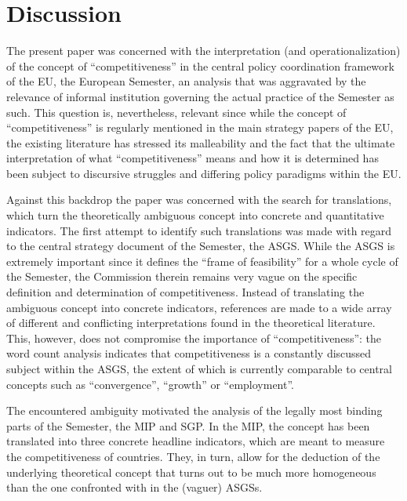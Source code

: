 \documentclass[
]{article}
\begin{document}
\FloatBarrier

\hypertarget{sec:concl}{%
\section{Discussion}\label{sec:concl}}

The present paper was concerned with the interpretation (and operationalization)
of the concept of \enquote{competitiveness} in the central policy
coordination framework of the EU, the European Semester, an analysis that
was aggravated by the relevance of informal institution governing the
actual practice of the Semester as such.
This question is, nevertheless, relevant since while the concept of
\enquote{competitiveness} is regularly mentioned in
the main strategy papers of the EU, the existing literature has stressed its
malleability and the fact
that the ultimate interpretation of what \enquote{competitiveness} means and how it
is determined has been subject to discursive struggles and differing policy
paradigms within the EU.

Against this backdrop the paper was concerned with the search for translations,
which turn the theoretically ambiguous concept into concrete and quantitative
indicators. The first attempt to identify such translations was made with
regard to the central strategy document of the Semester, the ASGS.
While the ASGS is extremely important since it
defines the \enquote{frame of feasibility} for a whole cycle of the Semester,
the Commission therein remains very
vague on the specific definition and determination of competitiveness.
Instead of translating the ambiguous concept into concrete indicators,
references are made to a wide array of different and conflicting interpretations
found in the theoretical literature.
This, however, does not compromise the importance of \enquote{competitiveness}: the
word count analysis indicates that competitiveness is a constantly discussed subject
within the ASGS, the extent of which is currently comparable to central concepts
such as \enquote{convergence}, \enquote{growth} or \enquote{employment}.

The encountered ambiguity motivated the analysis of the legally most binding
parts of the
Semester, the MIP and SGP. In the MIP, the concept has been translated into
three concrete headline indicators, which are meant to measure the
competitiveness of countries. They, in turn, allow for
the deduction of the underlying theoretical concept that turns out to be
much more homogeneous than the one confronted with in the (vaguer) ASGSs.
\end{document}
